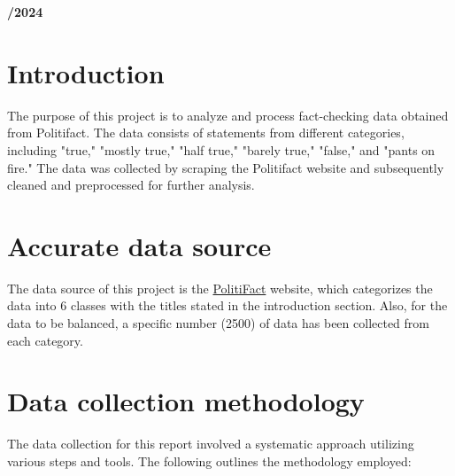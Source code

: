\documentclass[12pt]{article}
\begin{document}
\begin{center}
    \large \bf {}/2024
\end{center}

\thispagestyle{empty}

\setcounter{page}{0}

\newpage

\tableofcontents 

\newpage

\section{Introduction}

The purpose of this project is to analyze and process fact-checking data obtained from Politifact. The data consists of statements from different categories, including "true," "mostly true," "half true," "barely true," "false," and "pants on fire." The data was collected by scraping the Politifact website and subsequently cleaned and preprocessed for further analysis.

\section{Accurate data source} 

The data source of this project is the \href{https://www.politifact.com/factchecks/list}{\textcolor{istblue}{PolitiFact}} website, which categorizes the data into 6 classes with the titles stated in the introduction section. Also, for the data to be balanced, a specific number (2500) of data has been collected from each category.

\section{Data collection methodology}

The data collection for this report involved a systematic approach utilizing various steps and tools. The following outlines the methodology employed:
\end{document}

